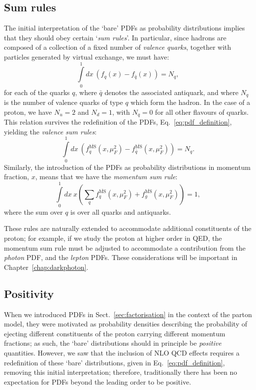 \documentclass[withindex,glossary]{cam-thesis}
\begin{document}
\subsection{Sum rules}
The initial interpretation of the `bare' PDFs as probability distributions implies that they should obey certain `\textit{sum rules}'. In particular, since hadrons are composed of a collection of a fixed number of \textit{valence quarks}, together with particles generated by virtual exchange, we must have:
\begin{equation}
\label{eq:bare_valence_sum_rule}
\int\limits_{0}^{1} dx\ \left( f_q(x) - f_{\bar{q}}(x) \right) = N_q,
\end{equation}
for each of the quarks $q$, where $\bar{q}$ denotes the associated antiquark, and where $N_q$ is the number of valence quarks of type $q$ which form the hadron. In the case of a proton, we have $N_u = 2$ and $N_d = 1$, with $N_q = 0$ for all other flavours of quarks. This relation survives the redefinition of the PDFs, Eq.~\eqref{eq:pdf_definition}, yielding the \textit{valence sum rules}:
\begin{equation}
\label{eq:valence_sum_rule}
\int\limits_{0}^{1} dx\ \left( f_q^{\overline{\text{MS}}}(x, \mu_F^2) - f_{\bar{q}}^{\overline{\text{MS}}}(x,\mu_F^2) \right) = N_q.
\end{equation}
Similarly, the introduction of the PDFs as probability distributions in momentum fraction, $x$, means that we have the \textit{momentum sum rule}:
\begin{equation}
\label{eq:momentum_sum_rule}
\int\limits_{0}^{1} dx\ x \left( \sum_{q} f_q^{\overline{\text{MS}}}(x, \mu_F^2) + f_g^{\overline{\text{MS}}}(x,\mu_F^2) \right) = 1,
\end{equation}
where the sum over $q$ is over all quarks and antiquarks.

These rules are naturally extended to accommodate additional constituents of the proton; for example, if we study the proton at higher order in QED, the momentum sum rule must be adjusted to accommodate a contribution from the \textit{photon} PDF, and the \textit{lepton} PDFs. These considerations will be important in Chapter~\ref{chap:darkphoton}.

\subsection{Positivity}
When we introduced PDFs in Sect.~\ref{sec:factorisation} in the context of the parton model, they were motivated as probability densities describing the probability of ejecting different constituents of the proton carrying different momentum fractions; as such, the `bare' distributions should in principle be \textit{positive} quantities. However, we saw that the inclusion of NLO QCD effects requires a redefinition of these `bare' distributions, given in Eq.~\eqref{eq:pdf_definition}, removing this initial interpretation; therefore, traditionally there has been no expectation for PDFs beyond the leading order to be positive.
\end{document}
